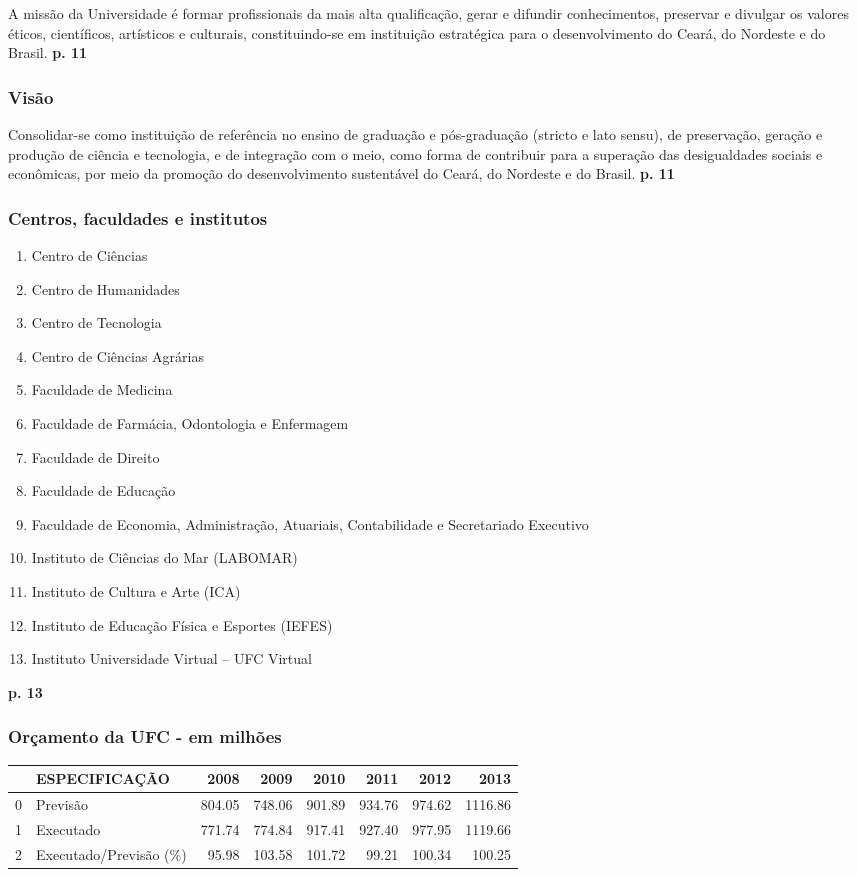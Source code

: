 \documentclass{article}
\begin{document}
A missão da Universidade é formar profissionais da mais alta qualificação, gerar e difundir conhecimentos, preservar e divulgar os valores éticos, científicos, artísticos e culturais, constituindo-se em instituição estratégica para o desenvolvimento do Ceará, do Nordeste e do Brasil.
\textbf{p. 11}

\subsubsection{Visão}

Consolidar-se como instituição de referência no ensino de graduação e pós-graduação (stricto e lato sensu), de preservação, geração e produção de ciência e tecnologia, e de integração com o meio, como forma de contribuir para a superação das desigualdades sociais e econômicas, por meio da promoção do desenvolvimento sustentável do Ceará, do Nordeste e do Brasil.
\textbf{p. 11}

\subsubsection{Centros, faculdades e institutos}

\begin{enumerate}
\item 
Centro de Ciências
\item 
Centro de Humanidades
\item 
Centro de Tecnologia
\item 
Centro de Ciências Agrárias
\item 
Faculdade de Medicina
\item 
Faculdade de Farmácia, Odontologia e Enfermagem
\item 
Faculdade de Direito
\item 
Faculdade de Educação
\item 
Faculdade de Economia, Administração, Atuariais, Contabilidade e Secretariado Executivo
\item 
Instituto de Ciências do Mar (LABOMAR)
\item 
Instituto de Cultura e Arte (ICA)
\item 
Instituto de Educação Física e Esportes (IEFES)
\item 
Instituto Universidade Virtual – UFC Virtual
\end{enumerate}
\textbf{p. 13}

\subsubsection{Orçamento da UFC - em milhões}
\begin{tabular}{llrrrrrr}
\toprule
{} &           ESPECIFICAÇÃO &    2008 &    2009 &    2010 &    2011 &    2012 &     2013 \\
\midrule
0 &                Previsão &  804.05 &  748.06 &  901.89 &  934.76 &  974.62 &  1116.86 \\
1 &               Executado &  771.74 &  774.84 &  917.41 &  927.40 &  977.95 &  1119.66 \\
2 &  Executado/Previsão (\%) &   95.98 &  103.58 &  101.72 &   99.21 &  100.34 &   100.25 \\
\bottomrule
\end{tabular}
\end{document}
